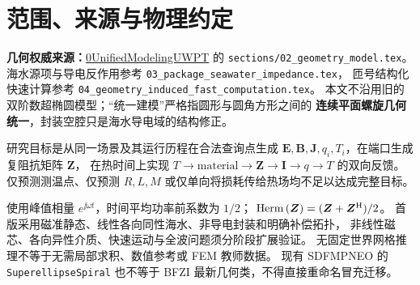 \section{范围、来源与物理约定}
\textbf{几何权威来源：}\href{https://github.com/AliceThunder/0UnifiedModelingUWPT}{0UnifiedModelingUWPT} 的
\texttt{sections/02\_geometry\_model.tex}。
海水源项与导电反作用参考 \texttt{03\_package\_seawater\_impedance.tex}，
匝号结构化快速计算参考 \texttt{04\_geometry\_induced\_fast\_computation.tex}。
本文不沿用旧的双阶数超椭圆模型；“统一建模”严格指圆形与圆角方形之间的
\textbf{连续平面螺旋几何统一}，封装空腔只是海水导电域的结构修正。

研究目标是从同一场景及其运行历程在合法查询点生成
\(\bm E,\bm B,\bm J,q_i,T_i\)，在端口生成复阻抗矩阵 \(\bm Z\)，
在热时间上实现 \(T\to\mathrm{material}\to\bm Z\to\bm I\to q\to T\) 的双向反馈。
仅预测测温点、仅预测 \(R,L,M\) 或仅单向将损耗传给热场均不足以达成完整目标。

使用峰值相量 \(e^{\jj\omega t}\)，时间平均功率前系数为 \(1/2\)；
\(\operatorname{Herm}\left(\bm Z\right)=(\bm Z+\bm Z^{\mathrm H})/2\)。
首版采用磁准静态、线性各向同性海水、非导电封装和明确补偿拓扑，
非线性磁芯、各向异性介质、快速运动与全波问题须分阶段扩展验证。
无固定世界网格推理不等于无需局部求积、数值参考或 FEM 教师数据。
现有 SDFMPNEO 的 \texttt{SuperellipseSpiral} 也不等于 BFZI 最新几何类，不得直接重命名冒充迁移。